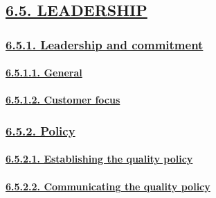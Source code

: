 \documentclass[
]{article}
\begin{document}
\hypertarget{leadership}{%
\subsection{\texorpdfstring{\protect\hyperlink{leadership-1}{6.5.
LEADERSHIP}}{6.5. LEADERSHIP}}\label{leadership}}

\hypertarget{leadership-and-commitment}{%
\subsubsection{\texorpdfstring{\protect\hyperlink{leadership-and-commitment-1}{6.5.1.
Leadership and
commitment}}{6.5.1. Leadership and commitment}}\label{leadership-and-commitment}}

\hypertarget{general}{%
\paragraph{\texorpdfstring{\protect\hyperlink{general-9}{6.5.1.1.
General}}{6.5.1.1. General}}\label{general}}

\hypertarget{customer-focus}{%
\paragraph{\texorpdfstring{\protect\hyperlink{customer-focus-1}{6.5.1.2.
Customer focus}}{6.5.1.2. Customer focus}}\label{customer-focus}}

\hypertarget{policy}{%
\subsubsection{\texorpdfstring{\protect\hyperlink{policy-1}{6.5.2.
Policy}}{6.5.2. Policy}}\label{policy}}

\hypertarget{establishing-the-quality-policy}{%
\paragraph{\texorpdfstring{\protect\hyperlink{establishing-the-quality-policy-1}{6.5.2.1.
Establishing the quality
policy}}{6.5.2.1. Establishing the quality policy}}\label{establishing-the-quality-policy}}

\hypertarget{communicating-the-quality-policy}{%
\paragraph{\texorpdfstring{\protect\hyperlink{communicating-the-quality-policy-1}{6.5.2.2.
Communicating the quality
policy}}{6.5.2.2. Communicating the quality policy}}\label{communicating-the-quality-policy}}
\end{document}
